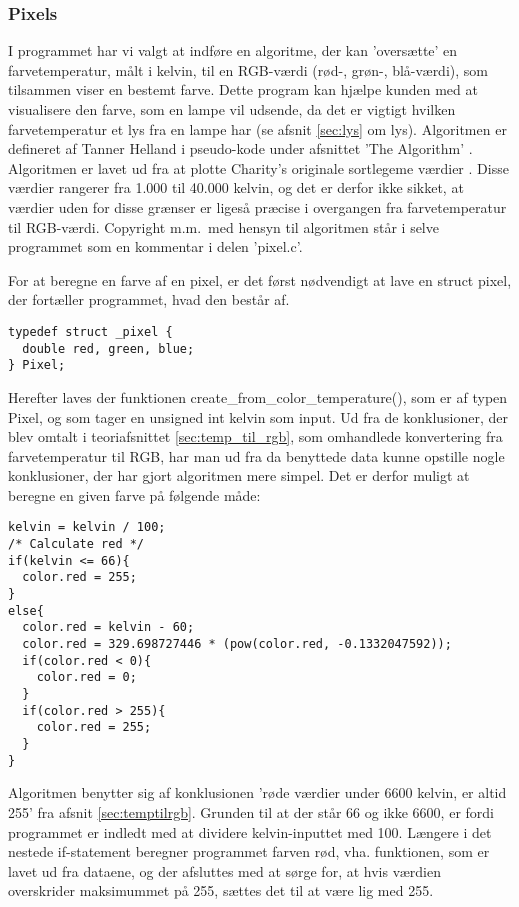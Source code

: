 \subsubsection{Pixels}
I programmet har vi valgt at indføre en algoritme, der kan ’oversætte’ en farvetemperatur, målt i kelvin, til en RGB-værdi (rød-, grøn-, blå-værdi), som tilsammen viser en bestemt farve. Dette program kan hjælpe kunden med at visualisere den farve, som en lampe vil udsende, da det er vigtigt hvilken farvetemperatur et lys fra en lampe har (se afsnit \ref{sec:lys} om lys). Algoritmen er defineret af Tanner Helland i pseudo-kode under afsnittet 'The Algorithm' \cite{tanner_helland}. Algoritmen er lavet ud fra at plotte Charity’s originale sortlegeme værdier \cite{charity_values}. Disse værdier rangerer fra 1.000 til 40.000 kelvin, og det er derfor ikke sikket, at værdier uden for disse grænser er ligeså præcise i overgangen fra farvetemperatur til RGB-værdi. Copyright m.m.\ med hensyn til algoritmen står i selve programmet som en kommentar i delen ’pixel.c’.


For at beregne en farve af en pixel, er det først nødvendigt at lave en struct pixel, der fortæller programmet, hvad den består af. 
\begin{lstlisting}[style=Cstyle, caption=Struct af Pixel]
typedef struct _pixel {
  double red, green, blue;
} Pixel;
\end{lstlisting}

Herefter laves der funktionen create\_from\_color\_temperature(), som er af typen Pixel, og som tager en unsigned int kelvin som input. Ud fra de konklusioner, der blev omtalt i teoriafsnittet \ref{sec:temp_til_rgb}, som omhandlede konvertering fra farvetemperatur til RGB, har man ud fra da benyttede data kunne opstille nogle konklusioner, der har gjort algoritmen mere simpel. Det er derfor muligt at beregne en given farve på følgende måde: 
\begin{lstlisting}[style=Cstyle, caption=Beregning af rød farve]
kelvin = kelvin / 100;
/* Calculate red */
if(kelvin <= 66){
  color.red = 255;
}
else{
  color.red = kelvin - 60;
  color.red = 329.698727446 * (pow(color.red, -0.1332047592));
  if(color.red < 0){
    color.red = 0;
  }
  if(color.red > 255){
    color.red = 255;
  }
}
\end{lstlisting}

Algoritmen benytter sig af konklusionen 'røde værdier under 6600 kelvin, er altid 255' fra afsnit \ref{sec:temptilrgb}. Grunden til at der står 66 og ikke 6600, er fordi programmet er indledt med at dividere kelvin-inputtet med 100. Længere i det nestede if-statement beregner programmet farven rød, vha. funktionen, som er lavet ud fra dataene, og der afsluttes med at sørge for, at hvis værdien overskrider maksimummet på 255, sættes det til at være lig med 255.


